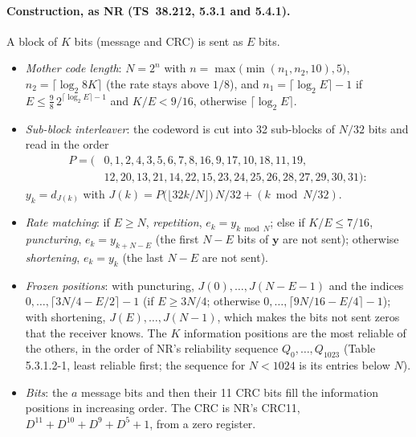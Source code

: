 \documentclass[11pt,a4paper]{article}
\theoremstyle{remark}
\begin{document}
\paragraph{Construction, as NR (TS~38.212, 5.3.1 and 5.4.1).}
A block of $K$ bits (message and CRC) is sent as $E$ bits.
\begin{itemize}
\item \emph{Mother code length}: $N = 2^n$ with $n = \max\bigl(\min(n_1, n_2, 10), 5\bigr)$, $n_2 = \lceil \log_2 8K \rceil$ (the rate stays above $1/8$), and $n_1 = \lceil \log_2 E \rceil - 1$ if $E \le \frac98\, 2^{\lceil \log_2 E \rceil - 1}$ and $K/E < 9/16$, otherwise $\lceil \log_2 E \rceil$.
\item \emph{Sub-block interleaver}: the codeword is cut into 32 sub-blocks of $N/32$ bits and read in the order
\begin{align*}
P = (&0, 1, 2, 4, 3, 5, 6, 7, 8, 16, 9, 17, 10, 18, 11, 19,\\
&12, 20, 13, 21, 14, 22, 15, 23, 24, 25, 26, 28, 27, 29, 30, 31):
\end{align*}
$y_k = d_{J(k)}$ with $J(k) = P\bigl(\lfloor 32k/N \rfloor\bigr)\, N/32 + (k \bmod N/32)$.
\item \emph{Rate matching}: if $E \ge N$, \emph{repetition}, $e_k = y_{k \bmod N}$; else if $K/E \le 7/16$, \emph{puncturing}, $e_k = y_{k + N - E}$ (the first $N - E$ bits of $\bm y$ are not sent); otherwise \emph{shortening}, $e_k = y_k$ (the last $N - E$ are not sent).
\item \emph{Frozen positions}: with puncturing, $J(0), \dots, J(N - E - 1)$ and the indices $0, \dots, \lceil 3N/4 - E/2 \rceil - 1$ (if $E \ge 3N/4$; otherwise $0, \dots, \lceil 9N/16 - E/4 \rceil - 1$); with shortening, $J(E), \dots, J(N - 1)$, which makes the bits not sent zeros that the receiver knows. The $K$ information positions are the most reliable of the others, in the order of NR's reliability sequence $Q_0, \dots, Q_{1023}$ (Table 5.3.1.2-1, least reliable first; the sequence for $N < 1024$ is its entries below $N$).
\item \emph{Bits}: the $a$ message bits and then their 11 CRC bits fill the information positions in increasing order. The CRC is NR's CRC11, $D^{11} + D^{10} + D^9 + D^5 + 1$, from a zero register.
\end{itemize}
\end{document}
